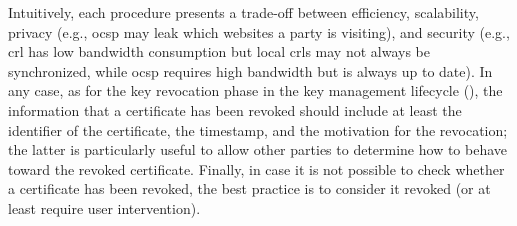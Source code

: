 Intuitively, each procedure presents a trade-off between efficiency, scalability, privacy (e.g., \gls{ocsp} may leak which websites a party is visiting), and security (e.g., \gls{crl} has low bandwidth consumption but local \glspl{crl} may not always be synchronized, while \gls{ocsp} requires high bandwidth but is always up to date). In any case, as for the key revocation phase in the key management lifecycle (), the information that a certificate has been revoked should include at least the identifier of the certificate, the timestamp, and the motivation for the revocation; the latter is particularly useful to allow other parties to determine how to behave toward the revoked certificate. Finally, in case it is not possible to check whether a certificate has been revoked, the best practice is to consider it revoked (or at least require user intervention).

